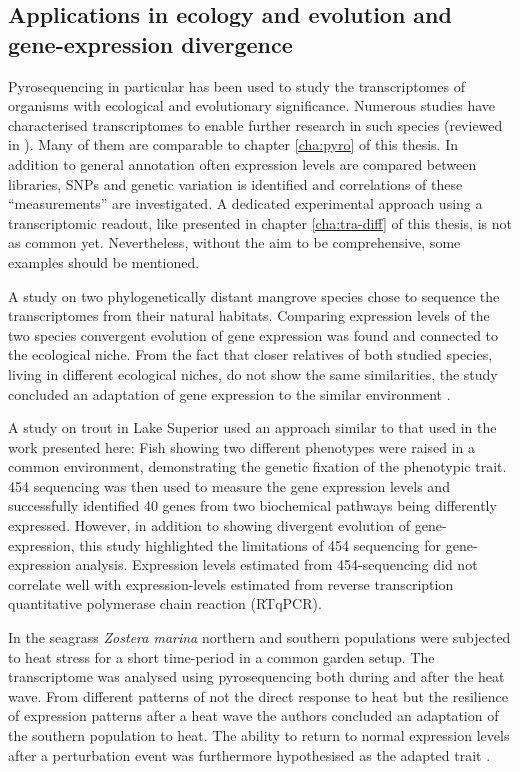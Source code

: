 \subsection{Applications in ecology and evolution and gene-expression
  divergence}
\label{sec:appl-ngs}

Pyrosequencing in particular has been used to study the transcriptomes
of organisms with ecological and evolutionary significance. Numerous
studies have characterised transcriptomes to enable further research
in such species (reviewed in \cite{pmid21139633}). Many of them are
comparable to chapter \ref{cha:pyro} of this thesis. In addition to
general annotation often expression levels are compared between
libraries, SNPs and genetic variation is identified and correlations
of these ``measurements'' are investigated. A dedicated experimental
approach using a transcriptomic readout, like presented in chapter
\ref{cha:tra-diff} of this thesis, is not as common yet. Nevertheless,
without the aim to be comprehensive, some examples should be
mentioned.

A study on two phylogenetically distant mangrove species chose to
sequence the transcriptomes from their natural habitats. Comparing
expression levels of the two species convergent evolution of gene
expression was found and connected to the ecological niche. From the
fact that closer relatives of both studied species, living in
different ecological niches, do not show the same similarities, the
study concluded an adaptation of gene expression to the similar
environment \cite{dassanayake2009shedding}.

A study on trout in Lake Superior \cite{pmid20331779} used an approach
similar to that used in the work presented here: Fish showing two
different phenotypes were raised in a common environment,
demonstrating the genetic fixation of the phenotypic trait. 454
sequencing was then used to measure the gene expression levels and
successfully identified 40 genes from two biochemical pathways being
differently expressed. However, in addition to showing divergent
evolution of gene-expression, this study highlighted the limitations
of 454 sequencing for gene-expression analysis. Expression levels
estimated from 454-sequencing did not correlate well with
expression-levels estimated from reverse transcription quantitative
polymerase chain reaction (RTqPCR).

In the seagrass \textit{Zostera marina} northern and southern
populations were subjected to heat stress for a short time-period in a
common garden setup. The transcriptome was analysed using
pyrosequencing both during and after the heat wave. From different
patterns of not the direct response to heat but the resilience of
expression patterns after a heat wave the authors concluded an
adaptation of the southern population to heat. The ability to return
to normal expression levels after a perturbation event was furthermore
hypothesised as the adapted trait \cite{pmid22084086}.

